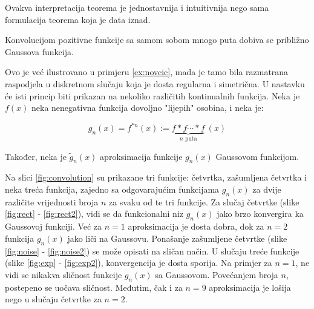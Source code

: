 Ovakva interpretacija teorema je jednostavnija i intuitivnija nego sama
formulacija teorema koja je data iznad.



\begin{corollary}
  Konvolucijom pozitivne funkcije sa samom sobom mnogo puta dobiva se približno
  Gaussova funkcija.
\end{corollary}

Ovo je već ilustrovano u primjeru \ref{ex:novcic}, mada je tamo bila razmatrana
raspodjela u diskretnom slučaju koja je dosta regularna i simetrična. U nastavku
će isti princip biti prikazan na nekoliko različitih kontinualnih funkcija. Neka
je $f(x)$ neka nenegativna funkcija dovoljno "lijepih" osobina, i neka je:

\begin{equation}
  g_n(x) = f^{*n}(x) := \underbrace{f*f\cdots*f}_{n\text{ puta}}\ (x)
\end{equation}

Također, neka je $\widetilde{g}_n(x)$ aproksimacija funkcije $g_n(x)$ Gaussovom
funkcijom.

Na slici \ref{fig:convolution} su prikazane tri funkcije: četvrtka, zašumljena
četvrtka i neka treća funkcija, zajedno sa odgovarajućim funkcijama $g_n(x)$ za
dvije različite vrijednosti broja $n$ za svaku od te tri funkcije. Za slučaj
četvrtke (slike \ref{fig:rect} - \ref{fig:rect2}), vidi se da funkcionalni niz
$g_n(x)$ jako brzo konvergira ka Gaussovoj funkciji. Već za $n=1$ aproksimacija
je dosta dobra, dok za $n=2$ funkcija $g_n(x)$ jako liči na Gaussovu. Ponašanje
zašumljene četvrtke (slike \ref{fig:noise} - \ref{fig:noise2}) se može opisati
na sličan način. U slučaju treće funkcije (slike \ref{fig:exp} -
\ref{fig:exp2}), konvergencija je dosta sporija. Na primjer za $n=1$, ne vidi se
nikakva sličnost funkcije $g_n(x)$ sa Gaussovom.  Povećanjem broja $n$,
postepeno se uočava sličnost. Međutim, čak i za $n=9$ aproksimacija je lošija
nego u slučaju četvrtke za $n=2$.

